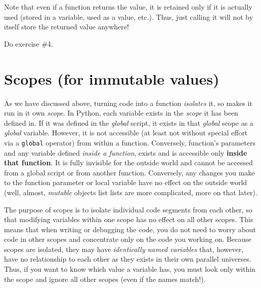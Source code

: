 \documentclass[
]{book}
\begin{document}
Note that even if a function returns the value, it is retained only if it is actually used (stored in a variable, used as a value, etc.). Thus, just calling it will not by itself store the returned value anywhere!

Do exercise \#4.

\hypertarget{scopes-for-immutable-values}{%
\section{Scopes (for immutable values)}\label{scopes-for-immutable-values}}

As we have discussed above, turning code into a function \emph{isolates} it, so makes it run in it own \emph{scope}. In Python, each variable exists in the \emph{scope} it has been defined in. If it was defined in the \emph{global} script, it exists in that \emph{global} scope as a \emph{global} variable. However, it is not accessible (at least not without special effort via a \texttt{global} operator) from within a function. Conversely, function's parameters and any variable defined \emph{inside a function}, exists and is accessible only \textbf{inside that function}. It is fully invisible for the outside world and cannot be accessed from a global script or from another function. Conversely, any changes you make to the function parameter or local variable have no effect on the outside world (well, almost, \emph{mutable} objects list lists are more complicated, more on that later).

The purpose of scopes is to isolate individual code segments from each other, so that modifying variables within one scope has no effect on all other scopes. This means that when writing or debugging the code, you do not need to worry about code in other scopes and concentrate only on the code you working on. Because scopes are isolated, they may have \emph{identically named variables} that, however, have no relationship to each other as they exists in their own parallel universes. Thus, if you want to know which value a variable has, you must look only within the scope and ignore all other scopes (even if the names match!).
\end{document}
